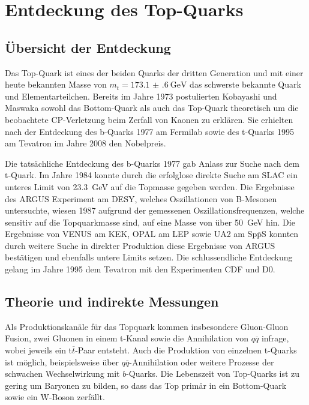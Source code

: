 
\section{Entdeckung des Top-Quarks}


\subsection{Übersicht der Entdeckung}

Das Top-Quark ist eines der beiden Quarks der dritten Generation und mit einer heute bekannten Masse von  $m_t = \SI{173.1(6)}{\giga\electronvolt}$ das schwerste bekannte Quark und Elementarteilchen.
Bereits im Jahre 1973 postulierten Kobayashi und Maswaka sowohl das Bottom-Quark als auch das Top-Quark theoretisch um die beobachtete CP-Verletzung beim Zerfall von Kaonen zu erklären.
Sie erhielten nach der Entdeckung des b-Quarks 1977 am Fermilab sowie des t-Quarks 1995 am Tevatron im Jahre 2008 den Nobelpreis.

Die tatsächliche Entdeckung des b-Quarks 1977 gab Anlass zur Suche nach dem t-Quark.
Im Jahre 1984 konnte durch die erfolglose direkte Suche am SLAC ein unteres Limit von \SI{23.3}{\giga\electronvolt} auf die Topmasse gegeben werden.
Die Ergebnisse des ARGUS Experiment am DESY, welches Oszillationen von B-Mesonen untersuchte, wiesen 1987 aufgrund der gemessenen Oszillationsfrequenzen, welche sensitiv auf die Topquarkmasse sind, auf eine Masse von über \SI{50}{\giga\electronvolt} hin.
Die Ergebnisse von VENUS am KEK, OPAL am LEP sowie UA2 am Sp$\overline{\text{p}}$S konnten durch weitere Suche in direkter Produktion diese Ergebnisse von ARGUS bestätigen und ebenfalls untere Limits setzen. 
Die schlussendliche Entdeckung gelang im Jahre 1995 dem Tevatron mit den Experimenten CDF und D0.

\subsection{Theorie und indirekte Messungen}

Als Produktionskanäle für das Topquark kommen insbesondere Gluon-Gluon Fusion, zwei Gluonen in einem t-Kanal sowie die Annihilation von $q\overline{q}$ infrage, wobei jeweils ein t$\overline{t}$-Paar entsteht.
Auch die Produktion von einzelnen t-Quarks ist möglich, beispielsweise über $q\overline{q}$-Annihilation oder weitere Prozesse der schwachen Wechselwirkung mit $b$-Quarks.
Die Lebenszeit von Top-Quarks ist zu gering um Baryonen zu bilden, so dass das Top primär in ein Bottom-Quark sowie ein W-Boson zerfällt.

